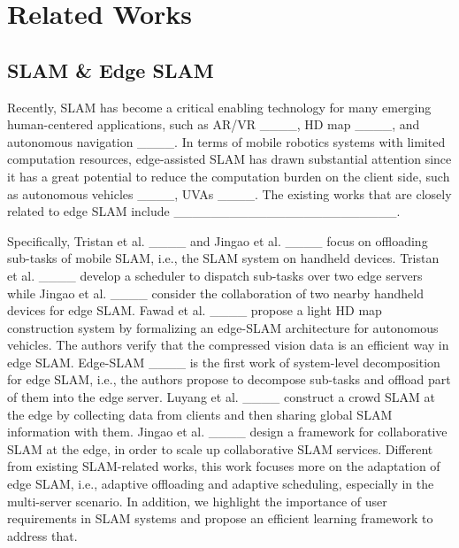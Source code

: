 \section{Related Works}
\label{relatedwork} 

\subsection{SLAM \& Edge SLAM}
Recently, SLAM has become a critical enabling technology for many emerging human-centered applications, such as AR/VR ____, HD map ____, and autonomous navigation ____. 
In terms of mobile robotics systems with limited computation resources, edge-assisted SLAM has drawn substantial attention since it has a great potential to reduce the computation burden on the client side, such as autonomous vehicles ____, UVAs ____. The existing works that are closely related to edge SLAM include
________________________. 

Specifically, Tristan et al. ____ and Jingao et al. ____ focus on offloading sub-tasks of mobile SLAM, i.e., the SLAM system on handheld devices. Tristan et al. ____ develop a scheduler to dispatch sub-tasks over two edge servers while Jingao et al. ____ consider the collaboration of two nearby handheld devices for edge SLAM. Fawad et al. ____ propose a light HD map construction system by formalizing an edge-SLAM architecture for autonomous vehicles. The authors verify that the compressed vision data is an efficient way in edge SLAM. Edge-SLAM ____ is the first work of system-level decomposition for edge SLAM, i.e., the authors propose to decompose sub-tasks and offload part of them into the edge server. Luyang et al. ____ construct a crowd SLAM at the edge by collecting data from clients and then sharing global SLAM information with them. Jingao et al. ____ design a framework for collaborative SLAM at the edge, in order to scale up collaborative SLAM services. Different from existing SLAM-related works, this work focuses more on the adaptation of edge SLAM, i.e., adaptive offloading and adaptive scheduling, especially in the multi-server scenario. In addition, we highlight the importance of user requirements in SLAM systems and propose an efficient learning framework to address that.
  
